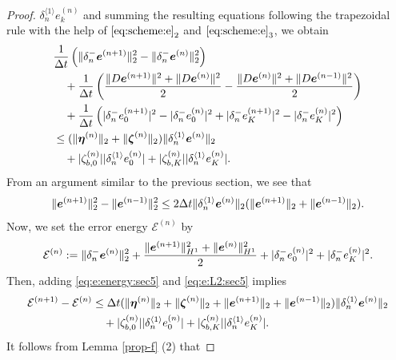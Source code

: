 \documentclass[dvipdfmx-if-dvi,autodetect-engine,ja=standard]{amsart}
\numberwithin{equation}{section} %
\def\vect#1{\mbox{\boldmath $#1$}} %
\begin{document}
\begin{proof}
$\delta_n^{\langle 1 \rangle} e_k^{(n)}$
and summing the resulting equations 
following the trapezoidal rule with the help of
$\eqref{eq:scheme:e}_2$ and $\eqref{eq:scheme:e}_3$,
we obtain 
\begin{align}\label{eq:e:energy:sec5}
    &\frac{1}{\Delta t} \left( \| \delta_n^- \vect{e}^{(n+1)} \|_2^2 - \| \delta_n^- \vect{e}^{(n)} \|_2^2 \right) \\
    &\quad
    + \frac{1}{\Delta t} \left( \frac{\| D \vect{e}^{(n+1)} \|^2 + \| D \vect{e}^{(n)} \|^2}{2} - \frac{\| D \vect{e}^{(n)} \|^2 + \| D \vect{e}^{(n-1)} \|^2}{2} \right)\\
    &\quad
    + \frac{1}{\Delta t}
    \left(
    | \delta_n^- e_0^{(n+1)} |^2 - |\delta_n^- e_0^{(n)} |^2
    + | \delta_n^- e_K^{(n+1)} |^2 - |\delta_n^- e_K^{(n)} |^2
    \right) \\
    &\leq (\| \vect{\eta}^{(n)} \|_2
    + \| \vect{\zeta}^{(n)} \|_2
    ) 
    \| \delta_n^{\langle 1 \rangle} \vect{e}^{(n)} \|_2 \\
    &\quad
    + |\zeta_{b,0}^{(n)}| | \delta_n^{\langle 1 \rangle} e_0^{(n)}|
    + |\zeta_{b,K}^{(n)}| | \delta_n^{\langle 1 \rangle} e_K^{(n)}|.
\end{align}
From an argument similar to the previous section, we see that 
\begin{align}\label{eq:e:L2:sec5}
\| \vect{e}^{(n+1)} \|_2^2 - \| \vect{e}^{(n-1)} \|_2^2
\leq
2 \Delta t  \| \delta_n^{\langle 1 \rangle}  \vect{e}^{(n)} \|_2 
(\| \vect{e}^{(n+1)} \|_2+ \| \vect{e}^{(n-1)} \|_2).
\end{align}
Now, we set the error energy
$\mathcal{E}^{(n)}$
by 
\begin{align}
    \mathcal{E}^{(n)}
    := \| \delta_n^- \vect{e}^{(n)} \|_2^2 + \frac{\| \vect{e}^{(n+1)} \|_{H^1}^2 + \| \vect{e}^{(n)} \|_{H^1}^2}{2}
    + |\delta_n^- e_0^{(n)}|^2 + |\delta_n^- e_K^{(n)}|^2.
\end{align}
Then, adding
\eqref{eq:e:energy:sec5} and \eqref{eq:e:L2:sec5}
implies
\begin{align}
    \mathcal{E}^{(n+1)} - \mathcal{E}^{(n)} 
    &\leq \Delta t (\| \vect{\eta}^{(n)} \|_2 + \| \vect{\zeta}^{(n)} \|_2
    + \| \vect{e}^{(n+1)} \|_2+ \| \vect{e}^{(n-1)} \|_2)  \| \delta_n^{\langle 1 \rangle} \vect{e}^{(n)} \|_2 \\
    &\quad
    + |\zeta_{b,0}^{(n)}| | \delta_n^{\langle 1 \rangle} e_0^{(n)}|
    + |\zeta_{b,K}^{(n)}| | \delta_n^{\langle 1 \rangle} e_K^{(n)}|.
\end{align}
It follows from Lemma \ref{prop-f} (2) that 

\end{proof}
\end{document}
